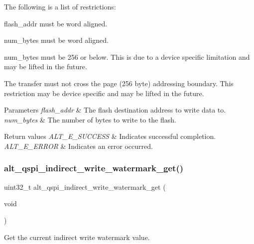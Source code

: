 The following is a list of restrictions\+:
\begin{DoxyItemize}
\item flash\+\_\+addr must be word aligned.
\item num\+\_\+bytes must be word aligned.
\item num\+\_\+bytes must be 256 or below. This is due to a device specific limitation and may be lifted in the future.
\item The transfer must not cross the page (256 byte) addressing boundary. This restriction may be device specific and may be lifted in the future.
\end{DoxyItemize}


\begin{DoxyParams}{Parameters}
{\em flash\+\_\+addr} & The flash destination address to write data to.\\
\hline
{\em num\+\_\+bytes} & The number of bytes to write to the flash.\\
\hline
\end{DoxyParams}

\begin{DoxyRetVals}{Return values}
{\em A\+L\+T\+\_\+\+E\+\_\+\+S\+U\+C\+C\+E\+SS} & Indicates successful completion. \\
\hline
{\em A\+L\+T\+\_\+\+E\+\_\+\+E\+R\+R\+OR} & Indicates an error occurred. \\
\hline
\end{DoxyRetVals}
\mbox{\label{group__ALT__QSPI__INDAC_gaa3558aff9a1c3995ad175b16cb4635ad}} 
\subsubsection{\texorpdfstring{alt\_qspi\_indirect\_write\_watermark\_get()}{alt\_qspi\_indirect\_write\_watermark\_get()}}
{\footnotesize\ttfamily uint32\+\_\+t alt\+\_\+qspi\+\_\+indirect\+\_\+write\+\_\+watermark\+\_\+get (\begin{DoxyParamCaption}\item[{void}]{ }\end{DoxyParamCaption})}

Get the current indirect write watermark value.

